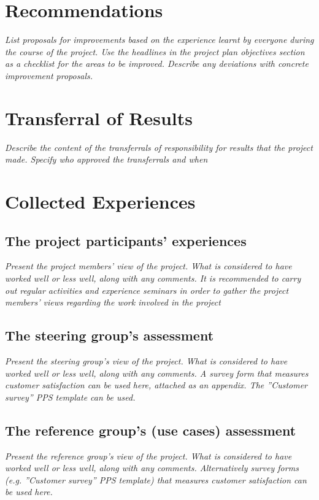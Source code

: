 \documentclass{article}
\begin{document}
\section{Recommendations}

{\it List proposals for improvements based on the experience learnt by everyone during the course of the project. Use the headlines in the project plan objectives section as a checklist  for the areas to be improved. Describe any deviations with concrete improvement proposals.}

\section{Transferral of Results}

{\it Describe the content of the transferrals of responsibility for results that the project made. Specify who approved the transferrals and when}

\section{Collected Experiences}

\subsection{The project participants’ experiences}
{\it Present the project members’ view of the project. What is considered to have worked well or less well, along with any comments. It is  recommended to carry out regular activities and experience seminars in order to gather the project members’ views regarding the work involved in the project}

\subsection{The steering group’s assessment}
{\it Present the steering group’s view of the project. What is considered to have worked well or less well, along with any comments.  A survey form that measures customer satisfaction can be used here, attached as an appendix. The ”Customer survey” PPS template can be used.}

\subsection{The reference group’s (use cases) assessment}
{\it Present the reference group’s view of the project. What is considered to have worked well or less well, along with any comments.  Alternatively survey forms (e.g. ”Customer survey” PPS template) that measures customer satisfaction can be used here.}
\end{document}

